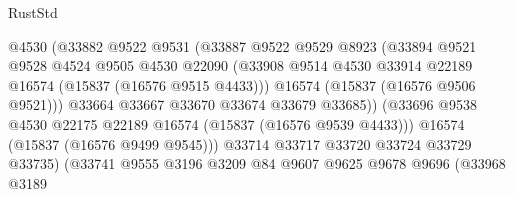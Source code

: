 \begin{lexlean}{RustStd}
\begin{coremodule}
                                    @4530
                                    (@33882
                                      @9522
                                      @9531
                                      (@33887
                                        @9522
                                        @9529
                                        @8923
                                        (@33894
                                          @9521
                                          @9528
                                          @4524
                                          @9505
                                          @4530
                                          @22090
                                          (@33908
                                            @9514
                                            @4530
                                            @33914
                                            @22189
                                            @16574
                                            (@15837 (@16576 @9515 @4433)))
                                          @16574
                                          (@15837 (@16576 @9506 @9521)))
                                        @33664
                                        @33667
                                        @33670
                                        @33674
                                        @33679
                                        @33685))
                                    (@33696
                                      @9538
                                      @4530
                                      @22175
                                      @22189
                                      @16574
                                      (@15837 (@16576 @9539 @4433)))
                                    @16574
                                    (@15837 (@16576 @9499 @9545)))
                                  @33714
                                  @33717
                                  @33720
                                  @33724
                                  @33729
                                  @33735)
                                (@33741
                                  @9555
                                  @3196
                                  @3209
                                  @84
                                  @9607
                                  @9625
                                  @9678
                                  @9696
                                  (@33968
                                    @3189

\end{coremodule}
\end{lexlean}
